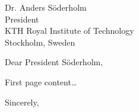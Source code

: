 \documentclass[12pt]{letter}
\date{}
\begin{document}
\begin{letter}{
Dr. Anders Söderholm\\
President\\
KTH Royal Institute of Technology\\
Stockholm, Sweden
}
\opening{Dear President Söderholm,}

First page content…


\closing{Sincerely,}
\end{letter}
\end{document}
